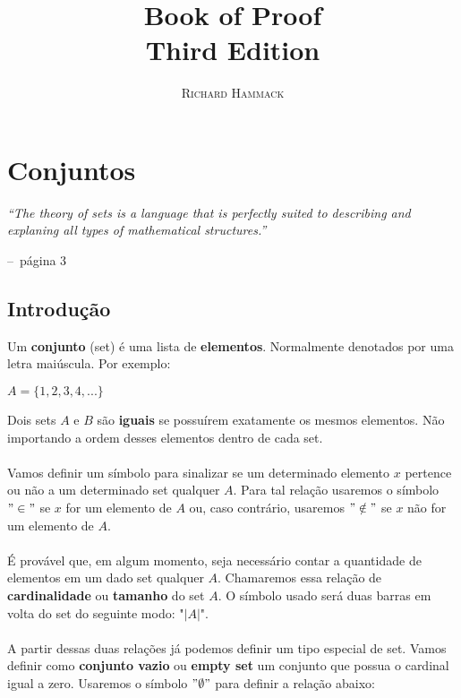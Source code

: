 \documentclass[a4paper,11pt]{book}
\title{\Huge \textbf{Book of Proof} \\ 
\huge Third Edition}
\author{\textsc{Richard Hammack}}
\makeatletter
\theoremstyle{definition}
\newenvironment{chapquote}[2][2em]
  {\setlength{\@tempdima}{#1}%
   \def\chapquote@author{#2}%
   \parshape 1 \@tempdima \dimexpr\textwidth-2\@tempdima\relax%
   \itshape}
  {\par\normalfont\hfill--\ \chapquote@author\hspace*{\@tempdima}\par\bigskip}
\makeatother
\begin{document}
\frontmatter
\maketitle

\tableofcontents

\mainmatter

\chapter{Conjuntos}


\begin{chapquote}{página 3}
	``The theory of sets is a language that is perfectly suited to describing and explaning all types of mathematical structures.''
\end{chapquote}


\section{Introdução}
Um \textbf{conjunto} (set) é uma lista de \textbf{elementos}. Normalmente denotados por uma letra maiúscula. Por exemplo:

\begin{center}
	$ A = \{1 , 2 , 3 , 4 , ... \} $
\end{center}

Dois sets $A$ e $B$ são \textbf{iguais} se possuírem exatamente os mesmos elementos. Não importando a ordem desses elementos dentro de cada set.
\\
\\
Vamos definir um símbolo para sinalizar se um determinado elemento $x$ pertence ou não a um determinado set qualquer $A$. Para tal relação usaremos o símbolo $"\in"$ se $x$ for um elemento de $A$ ou, caso contrário, usaremos $"\notin"$ se $x$ não for um elemento de $A$.
\\
\\
É provável que, em algum momento, seja necessário contar a quantidade de elementos em um dado set qualquer $A$. Chamaremos essa relação de \textbf{cardinalidade} ou \textbf{tamanho} do set $A$. O símbolo usado será duas barras em volta do set do seguinte modo: "$|A|$".
\\
\\
A partir dessas duas relações já podemos definir um tipo especial de set. Vamos definir como \textbf{conjunto vazio} ou \textbf{empty set} um conjunto que possua o cardinal igual a zero. Usaremos o símbolo $"\emptyset"$ para definir a relação abaixo:
\end{document}
